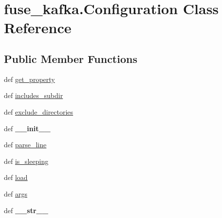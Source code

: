 \hypertarget{classfuse__kafka_1_1Configuration}{\section{fuse\-\_\-kafka.\-Configuration \-Class \-Reference}
\label{classfuse__kafka_1_1Configuration}
}
\subsection*{\-Public \-Member \-Functions}
\begin{DoxyCompactItemize}
\item 
def \hyperlink{classfuse__kafka_1_1Configuration_a962851606094dd5bc45ac8baa8fa0a16}{get\-\_\-property}
\item 
def \hyperlink{classfuse__kafka_1_1Configuration_aef5d3dda651dae8b01022f68900c2108}{includes\-\_\-subdir}
\item 
def \hyperlink{classfuse__kafka_1_1Configuration_ab13ba6dffdd3044c2200349628cd9c2b}{exclude\-\_\-directories}
\item 
\hypertarget{classfuse__kafka_1_1Configuration_ae3a1347719fa46a9431a8fb5164f3264}{def {\bfseries \-\_\-\-\_\-init\-\_\-\-\_\-}}\label{classfuse__kafka_1_1Configuration_ae3a1347719fa46a9431a8fb5164f3264}

\item 
def \hyperlink{classfuse__kafka_1_1Configuration_ab639bd7661a61dcc6faaba06966fa9ac}{parse\-\_\-line}
\item 
def \hyperlink{classfuse__kafka_1_1Configuration_a3c643a78420c5fbad7bb5dfd48718a6f}{is\-\_\-sleeping}
\item 
def \hyperlink{classfuse__kafka_1_1Configuration_acb3eac844331a816f9190441632951e1}{load}
\item 
def \hyperlink{classfuse__kafka_1_1Configuration_a63dba364a6a42dab38610389ab744124}{args}
\item 
\hypertarget{classfuse__kafka_1_1Configuration_a25a8f281fce858283ea4fcbac914f023}{def {\bfseries \-\_\-\-\_\-str\-\_\-\-\_\-}}\label{classfuse__kafka_1_1Configuration_a25a8f281fce858283ea4fcbac914f023}

\end{DoxyCompactItemize}
